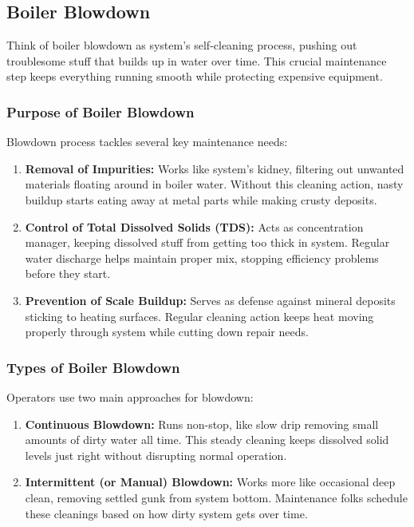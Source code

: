 \subsection{Boiler Blowdown}
Think of boiler blowdown as system's self-cleaning process, pushing out troublesome stuff that builds up in water over time. This crucial maintenance step keeps everything running smooth while protecting expensive equipment.
\subsubsection{Purpose of Boiler Blowdown}

Blowdown process tackles several key maintenance needs:
\begin{enumerate}
    \item \textbf{Removal of Impurities:} Works like system's kidney, filtering out unwanted materials floating around in boiler water. Without this cleaning action, nasty buildup starts eating away at metal parts while making crusty deposits.
    \item \textbf{Control of Total Dissolved Solids (TDS):} Acts as concentration manager, keeping dissolved stuff from getting too thick in system. Regular water discharge helps maintain proper mix, stopping efficiency problems before they start.
    \item \textbf{Prevention of Scale Buildup:} Serves as defense against mineral deposits sticking to heating surfaces. Regular cleaning action keeps heat moving properly through system while cutting down repair needs.
\end{enumerate}

\subsubsection{Types of Boiler Blowdown}
Operators use two main approaches for blowdown:
\begin{enumerate}
    \item \textbf{Continuous Blowdown:} Runs non-stop, like slow drip removing small amounts of dirty water all time. This steady cleaning keeps dissolved solid levels just right without disrupting normal operation.
    \item \textbf{Intermittent (or Manual) Blowdown:} Works more like occasional deep clean, removing settled gunk from system bottom. Maintenance folks schedule these cleanings based on how dirty system gets over time.
\end{enumerate}


